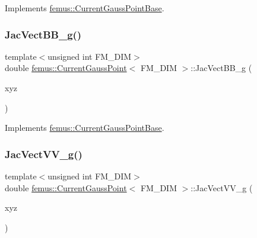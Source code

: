 Implements \mbox{\hyperlink{classfemus_1_1_current_gauss_point_base_a4aaaad9d57bead01f701396ad61acc21}{femus\+::\+Current\+Gauss\+Point\+Base}}.

\mbox{\label{classfemus_1_1_current_gauss_point_afa303733709a133cb86ba65fe70d4a31}} 
\subsubsection{\texorpdfstring{Jac\+Vect\+B\+B\+\_\+g()}{JacVectBB\_g()}}
{\footnotesize\ttfamily template$<$unsigned int F\+M\+\_\+\+D\+IM$>$ \\
double \mbox{\hyperlink{classfemus_1_1_current_gauss_point}{femus\+::\+Current\+Gauss\+Point}}$<$ F\+M\+\_\+\+D\+IM $>$\+::Jac\+Vect\+B\+B\+\_\+g (\begin{DoxyParamCaption}\item[{\mbox{\hyperlink{classfemus_1_1_current_quantity}{Current\+Quantity}} \&}]{xyz }\end{DoxyParamCaption})\hspace{0.3cm}{\ttfamily [virtual]}}



Implements \mbox{\hyperlink{classfemus_1_1_current_gauss_point_base_adad673ff1adf7b5f6967f7701825e95e}{femus\+::\+Current\+Gauss\+Point\+Base}}.

\mbox{\label{classfemus_1_1_current_gauss_point_a96a47ebb8abd928f0db6e472db2811f1}} 
\subsubsection{\texorpdfstring{Jac\+Vect\+V\+V\+\_\+g()}{JacVectVV\_g()}}
{\footnotesize\ttfamily template$<$unsigned int F\+M\+\_\+\+D\+IM$>$ \\
double \mbox{\hyperlink{classfemus_1_1_current_gauss_point}{femus\+::\+Current\+Gauss\+Point}}$<$ F\+M\+\_\+\+D\+IM $>$\+::Jac\+Vect\+V\+V\+\_\+g (\begin{DoxyParamCaption}\item[{\mbox{\hyperlink{classfemus_1_1_current_quantity}{Current\+Quantity}} \&}]{xyz }\end{DoxyParamCaption})\hspace{0.3cm}{\ttfamily [virtual]}}



